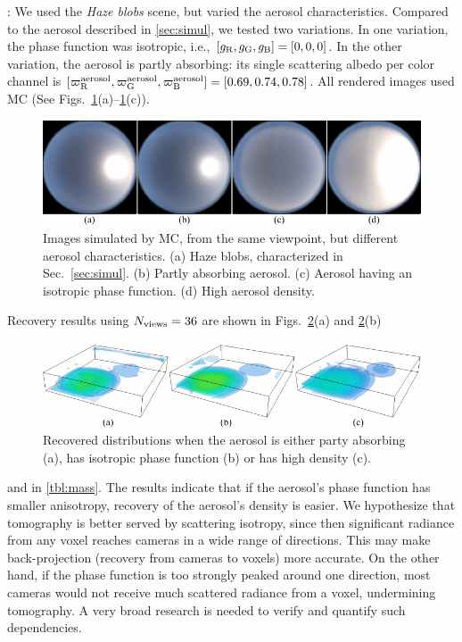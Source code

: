 \documentclass[10pt,letterpaper]{article}
\newcommand{\yoavcomment}[1]{}
\renewcommand{\yoavcomment}[1]{#1} %
\begin{document}
: We used the {\em Haze blobs} scene, but varied the
aerosol characteristics. Compared to the aerosol described in \cref{sec:simul}, we tested two variations. In one variation, the phase function was isotropic, i.e.,
$[g_{\rm R},g_{\rm G},g_{\rm B}]=[0,0,0]$. In the other variation, the aerosol is partly absorbing: its single scattering albedo per color channel is
$[\varpi^{\rm aerosol}_{\rm R},\varpi^{\rm aerosol}_{\rm G},\varpi^{\rm aerosol}_{\rm B}]=
[0.69,0.74,0.78]$.  All rendered images used MC
(See Figs.~\ref{fig:simulation_particles}(a)--\ref{fig:simulation_particles}(c)).
\begin{figure}[b]
  \centering
  \yoavcomment{\includegraphics{images/simulation_particles.pdf}}
  \caption{\small Images simulated by MC, from the same viewpoint, but different
  aerosol characteristics. (a) Haze blobs, characterized in Sec.~\ref{sec:simul}. 
  (b) Partly absorbing aerosol. (c) Aerosol having an isotropic phase function. (d) High aerosol density.}
  \label{fig:simulation_particles}
\end{figure}
Recovery results using $N_{\rm views}=36$ are shown in Figs.~\ref{fig:reconstructions}(a)
and \ref{fig:reconstructions}(b)
\begin{figure}[b]
  \centering
  \yoavcomment{\includegraphics{images/reconstructions.pdf}}
  \caption{\small  Recovered distributions when the aerosol is either party absorbing (a),
    has isotropic phase function (b) or has high density (c).}
  \label{fig:reconstructions}
\end{figure}
and in \cref{tbl:mass}. The results indicate that if the aerosol's phase function
has smaller anisotropy, recovery of the aerosol's density is easier. We hypothesize that
tomography is better served by scattering isotropy, since then significant radiance from
any voxel reaches cameras in a wide range of directions. This may make back-projection
(recovery from cameras to voxels) more accurate. On the other hand, if the phase function
is too strongly peaked around one direction, most cameras would not receive much scattered
radiance from a voxel, undermining tomography. A very broad research is needed to verify
and quantify such dependencies.\\
\end{document}
